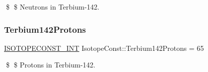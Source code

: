 \$ \$ Neutrons in Terbium-\/142. \mbox{\label{group___isotope_const-_terbium-_tb142_ga70bcaf3bebbd2ce8ed2fe41ffc2b869e}} 
\subsubsection{\texorpdfstring{Terbium142\+Protons}{Terbium142Protons}}
{\footnotesize\ttfamily \mbox{\hyperlink{group___isotope_const-_macros_ga5f18360b3e99483a35c32d789e62621c}{I\+S\+O\+T\+O\+P\+E\+C\+O\+N\+S\+T\+\_\+\+I\+NT}} Isotope\+Const\+::\+Terbium142\+Protons = 65}

\$ \$ Protons in Terbium-\/142. 